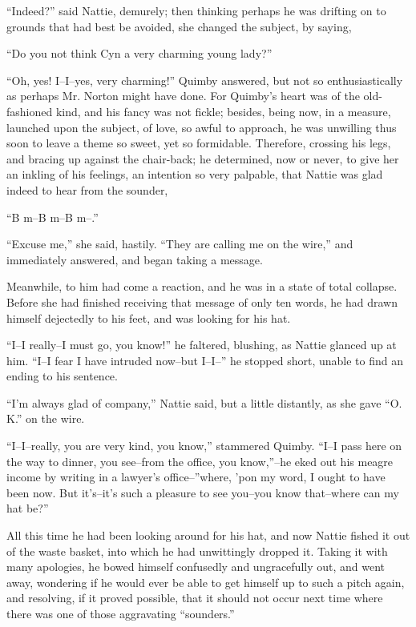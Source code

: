 ``Indeed?'' said Nattie, demurely; then thinking perhaps he was drifting
on to grounds that had best be avoided, she changed the subject, by
saying,

``Do you not think Cyn a very charming young lady?''

``Oh, yes! I--I--yes, very charming!'' Quimby answered, but not so
enthusiastically as perhaps Mr. Norton might have done. For Quimby's
heart was of the old-fashioned kind, and his fancy was not fickle;
besides, being now, in a measure, launched upon the subject, of love, so
awful to approach, he was unwilling thus soon to leave a theme so sweet,
yet so formidable. Therefore, crossing his legs, and bracing up against
the chair-back; he determined, now or never, to give her an inkling of
his feelings, an intention so very palpable, that Nattie was glad indeed
to hear from the sounder,

``B m--B m--B m--.''

``Excuse me,'' she said, hastily. ``They are calling me on the wire,'' and
immediately answered, and began taking a message.

Meanwhile, to him had come a reaction, and he was in a state of total
collapse. Before she had finished receiving that message of only ten
words, he had drawn himself dejectedly to his feet, and was looking for
his hat.

``I--I really--I must go, you know!'' he faltered, blushing, as Nattie
glanced up at him. ``I--I fear I have intruded now--but I--I--'' he
stopped short, unable to find an ending to his sentence.

``I'm always glad of company,'' Nattie said, but a little distantly, as
she gave ``O. K.'' on the wire.

``I--I--really, you are very kind, you know,'' stammered Quimby. ``I--I
pass here on the way to dinner, you see--from the office, you know,''--he
eked out his meagre income by writing in a lawyer's office--''where, 'pon
my word, I ought to have been now. But it's--it's such a pleasure to see
you--you know that--where can my hat be?''

All this time he had been looking around for his hat, and now Nattie
fished it out of the waste basket, into which he had unwittingly dropped
it. Taking it with many apologies, he bowed himself confusedly and
ungracefully out, and went away, wondering if he would ever be able to
get himself up to such a pitch again, and resolving, if it proved
possible, that it should not occur next time where there was one of
those aggravating ``sounders.''

